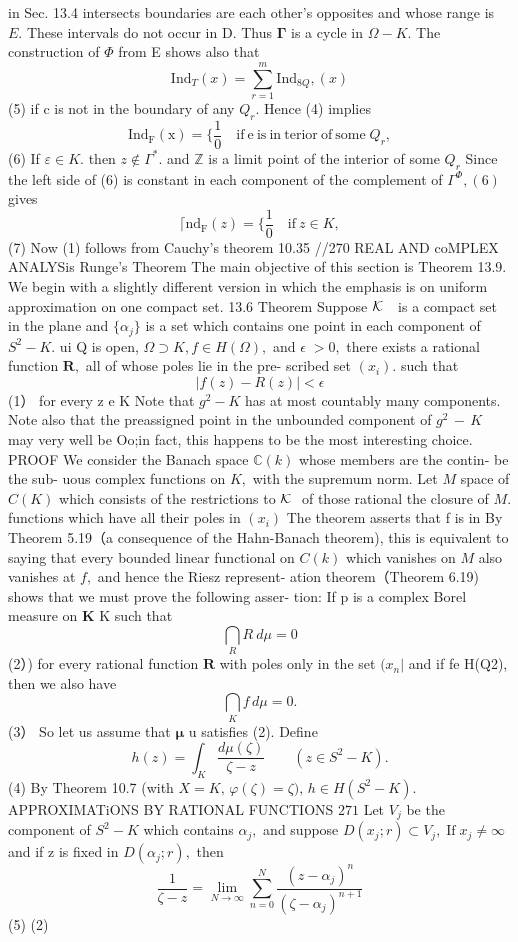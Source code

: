 in Sec. 13.4 intersects boundaries are each other's opposites and whose range is $\textstyle E.$ These intervals do not occur in D. Thus ${\boldsymbol{\Gamma}}$ is a cycle in $\Omega-K.$ The construction of $\Phi$ from E shows also that $$ \mathrm{Ind}_{T}\left(x\right)=\sum_{r=1}^{m}\mathrm{Ind}_{8Q},\left(x\right) $$ (5) if c is not in the boundary of any $Q_{r}.$ Hence (4) implies $$ \mathrm{Ind_{F}\left(x\right)=} \{{\frac{1}{0}}\quad\mathrm{if~e~is~in~terior~of~some}\;Q_{r}, $$ (6) If $\varepsilon\in K.$ then $z\not\in\Gamma^{*}.$ and $\mathbb{Z}$ is a limit point of the interior of some $Q_{r}$ Since the left side of (6) is constant in each component of the complement of $\Gamma^{\Phi},(6)$ gives $$ \lceil\mathrm{nd_{F}}\left(z\right)= \{\frac{1}{0}\quad\mathrm{if~}z\in K, $$ (7) Now (1) follows from Cauchy's theorem 10.35 //270 REAL AND coMPLEX ANALYSis Runge's Theorem The main objective of this section is Theorem 13.9. We begin with a slightly different version in which the emphasis is on uniform approximation on one compact set. 13.6 Theorem Suppose ${\cal K}\,\,\,\,$ is a compact set in the plane and $\{\alpha_{j}\}$ is a set which contains one point in each component of $S^{2}-K.$ ui Q is open, $\Omega\supset K,f\in H(\Omega),$ and $\scriptstyle\epsilon\;>0,$ there exists a rational function ${\boldsymbol{R}},$ all of whose poles lie in the pre- scribed set $(x_{i}).$ such that $$ |f(z)-R(z)|<\epsilon $$ (1） for every z e K Note that $\scriptstyle{g^{2}-K}$ has at most countably many components. Note also that the preassigned point in the unbounded component of $\scriptstyle g^{2}\,-\,K$ may very well be Oo;in fact, this happens to be the most interesting choice. PROOF We consider the Banach space $\mathbb{C}(k)$ whose members are the contin- be the sub- uous complex functions on $K,$ with the supremum norm. Let $\textstyle{M}$ space of $C(K)$ which consists of the restrictions to ${\cal K}\,\,$ of those rational the closure of $\textstyle{M}.$ functions which have all their poles in $\scriptstyle(x_{i})$ The theorem asserts that f is in By Theorem 5.19（a consequence of the Hahn-Banach theorem), this is equivalent to saying that every bounded linear functional on $\scriptstyle C(k)$ which vanishes on $\textstyle{M}$ also vanishes at $f,$ and hence the Riesz represent- ation theorem（Theorem 6.19) shows that we must prove the following asser- tion: If p is a complex Borel measure on ${\boldsymbol{K}}$ K such that $$ \bigcap_{R}R\ d\mu=0 $$ (2）) for every rational function ${\boldsymbol{R}}$ with poles only in the set $\scriptstyle(x_{n}|$ and if fe H(Q2), then we also have $$ \bigcap_{K}f\,d\mu=0. $$ (3） So let us assume that ${\boldsymbol{\mu}}$ u satisfies (2). Define $$ h(z)=\int_{K}{\frac{d\mu(\zeta)}{\zeta-z}}\quad\quad(z\in S^{2}-K). $$ (4) By Theorem 10.7 (with $X=K,\,\varphi(\zeta)=\zeta),\,h\in H(S^{2}-K).$APPROXIMATiONS BY RATIONAL FUNCTIONS $271$ Let ${\mathit{V}}_{j}$ be the component of $\scriptstyle{S^{2}-K}$ which contains $\alpha_{j},$ and suppose $D(x_{j};r)\subset V_{j},\operatorname{If}x_{j}\neq\infty$ and if z is fixed in $D(\alpha_{j};r),$ then $$ {\frac{1}{\zeta-z}}=\operatorname*{lim}_{N\to\infty}\sum_{n=0}^{N}{\frac{(z-\alpha_{j})^{n}}{(\zeta-\alpha_{j})^{n+1}}} $$ (5) (2) 